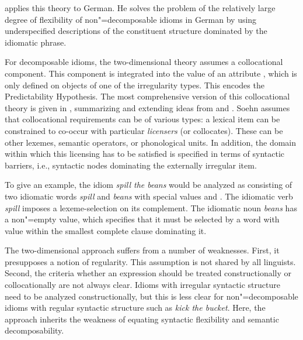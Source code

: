 \documentclass[output=paper]{langsci/langscibook}
\begin{document}
\cite{Soehn2006a} applies this theory to German. He solves the problem of the relatively large degree of flexibility of non"=decomposable idioms in German
by using underspecified descriptions of the constituent structure dominated by the idiomatic phrase.

For decomposable idioms, the two-dimensional theory assumes a collocational component. This component is integrated into the value of an attribute , which is only defined on  objects of one of the irregularity types. 
This encodes the Predictability Hypothesis.
%
The most comprehensive version of this collocational theory is given in \cite{Soehn:09}, summarizing and extending ideas from \cite{Soehn2006a} and \cite{richter-soehn:2006}. 
Soehn assumes that collocational requirements can be of various types: 
a lexical item can be constrained to co-occur with particular \emph{licensers} (or collocates). These can be other lexemes, semantic operators, or phonological units. In addition, the domain within which this licensing has to be satisfied is specified in terms of syntactic barriers, i.e., syntactic nodes dominating the externally irregular item.

To give an example, the idiom \emph{spill the beans} would be analyzed as consisting of two  idiomatic words \emph{spill} and \emph{beans} with special  values  and . The idiomatic verb \emph{spill} imposes a lexeme-selection on its complement. The idiomatic noun \emph{beans} has a non"=empty  value, which specifies that it must be selected by a word with  value  within the smallest complete clause dominating it.


The two-dimensional approach suffers from a number of weaknesses. 
First, it presupposes a notion of regularity. This assumption is not shared by all linguists.
Second, the criteria whether an expression should be treated constructionally or collocationally are not always clear. Idioms with irregular syntactic structure need to be analyzed constructionally, but this is less clear for non"=decomposable idioms with regular syntactic structure such as \emph{kick the bucket}.
Here, the approach inherits the weakness of \cite{WSN84a-u} equating syntactic flexibility and semantic decomposability.

\end{document}
